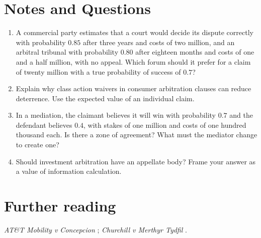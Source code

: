 \section*{Notes and Questions}
\begin{enumerate}[label=\arabic*.]
\item A commercial party estimates that a court would decide its dispute correctly with probability $0.85$ after three years and costs of two million, and an arbitral tribunal with probability $0.80$ after eighteen months and costs of one and a half million, with no appeal. Which forum should it prefer for a claim of twenty million with a true probability of success of $0.7$?
\item Explain why class action waivers in consumer arbitration clauses can reduce deterrence. Use the expected value of an individual claim.
\item In a mediation, the claimant believes it will win with probability $0.7$ and the defendant believes $0.4$, with stakes of one million and costs of one hundred thousand each. Is there a zone of agreement? What must the mediator change to create one?
\item Should investment arbitration have an appellate body? Frame your answer as a value of information calculation.
\end{enumerate}

\section*{Further reading}
\emph{AT\&T Mobility v Concepcion} \citep{concepcion2011}; \emph{Churchill v Merthyr Tydfil} \citep{churchill2023}.
